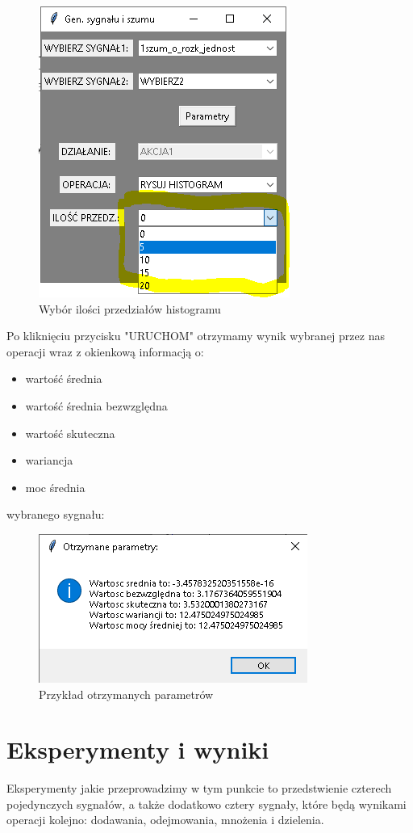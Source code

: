 \documentclass[12pt]{article}
\begin{document}
\begin{itemize}
\begin{figure}[H]
\centering
\includegraphics[scale=0.9]{menu66.png}
\caption{Wybór ilości przedziałów histogramu}
\end{figure}
\end{itemize}
Po kliknięciu przycisku "{URUCHOM}"{ }otrzymamy wynik wybranej przez nas operacji wraz z okienkową informacją o: 
\begin{itemize}
\item wartość średnia
\item wartość średnia bezwzględna
\item wartość skuteczna
\item wariancja
\item moc średnia
\end{itemize}
wybranego sygnału:

\begin{figure}[H]
\centering
\includegraphics[scale=1.0]{menu77.png}
\caption{Przykład otrzymanych parametrów}
\end{figure}

\section{Eksperymenty i wyniki}
Eksperymenty jakie przeprowadzimy w tym punkcie to przedstwienie czterech pojedynczych sygnałów, a także dodatkowo cztery sygnały, które będą wynikami operacji kolejno: dodawania, odejmowania, mnożenia i dzielenia. 
\end{document}
